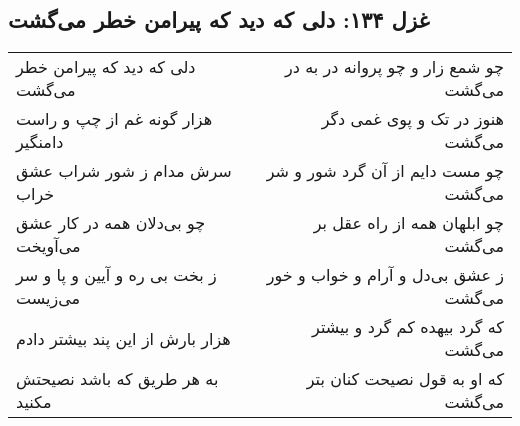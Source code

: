 \begin{center}
\section*{غزل ۱۳۴: دلی که دید که پیرامن خطر می‌گشت}
\label{sec:134}
\begin{longtable}{l p{0.5cm} r}
دلی که دید که پیرامن خطر می‌گشت
&&
چو شمع زار و چو پروانه در به در می‌گشت
\\
هزار گونه غم از چپ و راست دامنگیر
&&
هنوز در تک و پوی غمی دگر می‌گشت
\\
سرش مدام ز شور شراب عشق خراب
&&
چو مست دایم از آن گرد شور و شر می‌گشت
\\
چو بی‌دلان همه در کار عشق می‌آویخت
&&
چو ابلهان همه از راه عقل بر می‌گشت
\\
ز بخت بی ره و آیین و پا و سر می‌زیست
&&
ز عشق بی‌دل و آرام و خواب و خور می‌گشت
\\
هزار بارش از این پند بیشتر دادم
&&
که گرد بیهده کم گرد و بیشتر می‌گشت
\\
به هر طریق که باشد نصیحتش مکنید
&&
که او به قول نصیحت کنان بتر می‌گشت
\\
\end{longtable}
\end{center}
